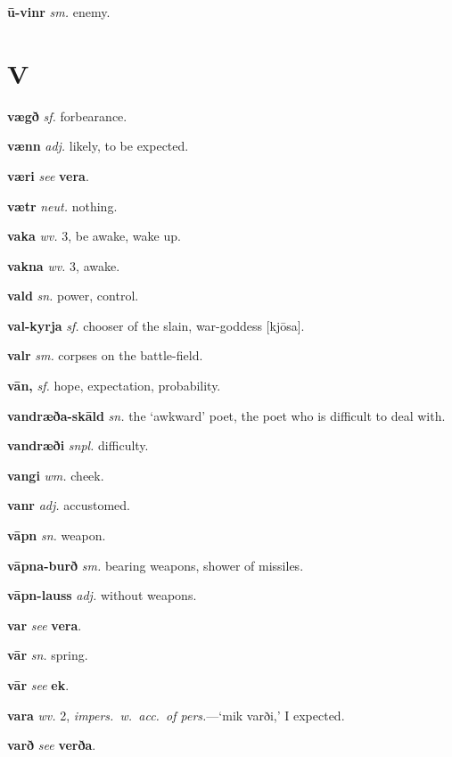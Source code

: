 \documentclass[12pt,letterpaper]{book}
\newcommand\emptypage{\clearpage{\pagestyle{empty}\cleardoublepage}}
\begin{document}
\noindent
\textbf{ū-vinr} \textit{sm.} enemy.

\emptypage

\chapter*{V}

\noindent
\textbf{vægð} \textit{sf.} forbearance.

\noindent
\textbf{vænn} \textit{adj.} likely, to be expected.

\noindent
\textbf{væri} \textit{} \textit{see} \textbf{vera}.

\noindent
\textbf{vætr} \textit{neut.} nothing.

\noindent
\textbf{vaka} \textit{wv.} 3, be awake, wake up.

\noindent
\textbf{vakna} \textit{wv.} 3, awake.

\noindent
\textbf{vald} \textit{sn.} power, control.

\noindent
\textbf{val-kyrja} \textit{sf.} chooser of the slain,
	war-goddess [kjōsa].

\noindent
\textbf{valr} \textit{sm.} corpses on the battle-field.

\noindent
\textbf{vān,} \textit{sf.} hope, expectation, probability.

\noindent
\textbf{vandræða-skāld} \textit{sn.} the `awkward' poet, the poet
	who is difficult to deal with.

\noindent
\textbf{vandræði} \textit{snpl.} difficulty.

\noindent
\textbf{vangi} \textit{wm.} cheek.

\noindent
\textbf{vanr} \textit{adj.} accustomed.

\noindent
\textbf{vāpn} \textit{sn.} weapon.

\noindent
\textbf{vāpna-burð} \textit{sm.} bearing weapons, shower of missiles.

\noindent
\textbf{vāpn-lauss} \textit{adj.} without weapons.

\noindent
\textbf{var} \textit{} \textit{see} \textbf{vera}.

\noindent
\textbf{vār} \textit{sn.} spring.

\noindent
\textbf{vār} \textit{} \textit{see} \textbf{ek}.

\noindent
\textbf{vara} \textit{wv.} 2, \textit{impers.\ w.\ acc.\ of pers.}---`mik varði,'
	I expected.

\noindent
\textbf{varð} \textit{} \textit{see} \textbf{verða}.
\end{document}
